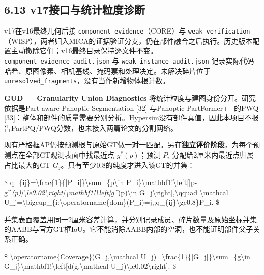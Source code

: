 \documentclass[UTF8,fontset=fandol]{ctexart}
\begin{document}
\subsection*{6.13 v17接口与统计粒度诊断}

v17在v16最终几何后接 \texttt{component\_\allowbreak{}evidence}（CORE）与 \texttt{weak\_\allowbreak{}verification}（WISP），两者归入MICA的证据验证分支，仍在部件融合之后执行。历史版本配置主动撤除它们；v16最终目录保持逐文件不变。\texttt{component\_\allowbreak{}evidence\_\allowbreak{}audit.\allowbreak{}json} 与 \texttt{weak\_\allowbreak{}instance\_\allowbreak{}audit.\allowbreak{}json} 记录实际代码哈希、原图像素、相机基线、掩码票和处理决定。未解决碎片位于 \texttt{unresolved\_\allowbreak{}fragments}，没有当作新增物体根计数。



\textbf{GUD — Granularity Union Diagnostics} 将统计粒度与建图身份分开。研究依据是Part-aware Panoptic Segmentation [32] 与Panoptic-PartFormer++的PWQ [33]：整体和部件的质量需要分别分析。Hypersim没有部件真值，因此本项目不报告PartPQ/PWQ分数，也未接入两篇论文的分割网络。



现有严格框AP仍按预测根与原始GT做一对一匹配。另在\textbf{独立评价阶段}，为每个预测点在全部GT观测表面中找最近点 $g^*(p)$；预测 $P_i$ 分配给2厘米内最近点归属占比最大的GT $G_j$。只有至少0.8的纯度才进入该GT的并集：



\$
q\_\{ij\}=\textbackslash{}frac\{1\}\{|P\_i|\}\textbackslash{}sum\_\{p\textbackslash{}in P\_i\}\textbackslash{}mathbf1!\textbackslash{}left[|p-g\textasciicircum{}\emph{(p)|\textbackslash{}le0.02\textbackslash{}right]\textbackslash{}mathbf1!\textbackslash{}left[g\textasciicircum{}}(p)\textbackslash{}in G\_j\textbackslash{}right],\textbackslash{}qquad
\textbackslash{}mathcal U\_j=\textbackslash{}bigcup\_\{i:\textbackslash{}operatorname\{dom\}(P\_i)=j,;q\_\{ij\}\textbackslash{}ge0.8\}P\_i.
\$



并集表面覆盖用同一2厘米容差计算，并分别记录成员、碎片数量及原始坐标并集的AABB与官方GT框IoU。它不能消除AABB内部的空洞，也不能证明部件父子关系正确。



\$
\textbackslash{}operatorname\{Coverage\}(G\_j,\textbackslash{}mathcal U\_j)=\textbackslash{}frac\{1\}\{|G\_j|\}\textbackslash{}sum\_\{g\textbackslash{}in G\_j\}\textbackslash{}mathbf1!\textbackslash{}left[d(g,\textbackslash{}mathcal U\_j)\textbackslash{}le0.02\textbackslash{}right].
\$
\end{document}
